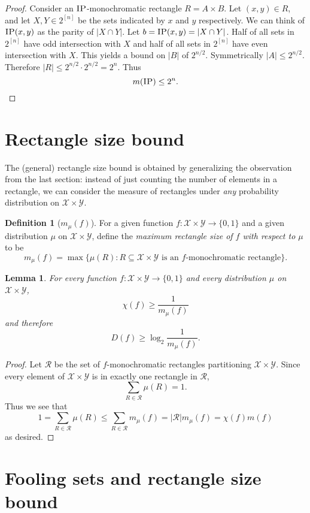 \documentclass[11pt]{amsart}
\theoremstyle{plain}
\newtheorem{lemma}{Lemma}
\theoremstyle{definition}
\newtheorem{definition}{Definition}
\theoremstyle{plain}
\newcommand{\calX}{\mathcal{X}}
\newcommand{\calY}{\mathcal{Y}}
\newcommand{\IP}{\textsc{IP}}
\begin{document}
\begin{proof}
Consider an $\IP$-monochromatic rectangle $R = A\times B$. Let $(x,y) \in R$, and let $X, Y \in 2^{[n]}$ be the sets indicated by $x$ and $y$ respectively. We can think of $\IP(x,y)$ as the parity of $|X\cap Y|$. Let $b = \IP(x,y) = |X\cap Y|$. Half of all sets in $2^{[n]}$ have odd intersection with $X$ and half of all sets in $2^{[n]}$ have even intersection with $X$. This yields a bound on $|B|$ of $2^{n/2}$. Symmetrically $|A| \leq 2^{n/2}$. Therefore
$|R| \leq 2^{n/2}\cdot 2^{n/2} = 2^n$. Thus
$$m(\IP) \leq 2^n.$$
\end{proof}


\newpage \section{Rectangle size bound}

The (general) rectangle size bound is obtained by generalizing the observation from the last section: instead of just counting the number of elements in a rectangle, we can consider the measure of rectangles under \emph{any} probability distribution on $\calX \times \calY$.

\begin{definition}[$m_\mu(f)$]
For a given function $f : \calX \times \calY \to \{0,1\}$ and a given distribution $\mu$ on $\calX \times \calY$, define the \emph{maximum rectangle size of $f$ with respect to $\mu$} to be
\[
m_\mu(f) = \max \{ \mu(R) : R \subseteq \calX \times \calY \mbox{ is an $f$-monochromatic rectangle} \}.
\]
\end{definition}


\begin{lemma}
For every function $f : \calX \times \calY \to \{0,1\}$ and every distribution $\mu$ on $\calX \times \calY$, 
\[
\chi(f) \ge \frac1{m_\mu(f)}
\]
and therefore
\[
D(f) \ge \log_2 \frac{1}{m_\mu(f)}.
\]
\end{lemma}

\begin{proof}
Let $\mathcal{R}$ be the set of $f$-monochromatic rectangles partitioning $\mathcal{X}\times \mathcal{Y}$. Since every element of $\mathcal{X}\times\mathcal{Y}$ is in exactly one rectangle in $\mathcal{R}$,
$$\sum_{R \in \mathcal{R}} \mu(R) = 1.$$
Thus we see that
$$1 = \sum_{R \in \mathcal{R}} \mu(R) \le \sum_{R \in \mathcal{R}} m_\mu(f) = |\mathcal{R}|m_\mu(f) = \chi(f)m(f)$$
as desired.
\end{proof}


\newpage \section{Fooling sets and rectangle size bound}
\end{document}
